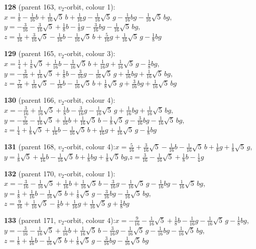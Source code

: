 \documentclass[10pt]{article}
\begin{document}
{\noindent\textbf{128} (parent 163, $v_2$-orbit, colour 1):\quad $x=\tfrac{1}{8}-\tfrac{1}{16}b+\tfrac{1}{16}\sqrt5\,b+\tfrac{1}{16}g-\tfrac{1}{16}\sqrt5\,g-\tfrac{1}{16}bg-\tfrac{1}{16}\sqrt5\,bg$,\quad $y=-\tfrac{3}{16}-\tfrac{3}{16}\sqrt5+\tfrac{1}{8}b-\tfrac{1}{8}g-\tfrac{3}{16}bg-\tfrac{1}{16}\sqrt5\,bg$,\quad $z=\tfrac{1}{16}+\tfrac{3}{16}\sqrt5-\tfrac{1}{16}b-\tfrac{1}{16}\sqrt5\,b+\tfrac{5}{16}g+\tfrac{1}{16}\sqrt5\,g-\tfrac{1}{8}bg$\par\smallskip
\noindent\textbf{129} (parent 165, $v_2$-orbit, colour 3):\quad $x=\tfrac{1}{4}+\tfrac{1}{8}\sqrt5+\tfrac{1}{16}b-\tfrac{1}{16}\sqrt5\,b+\tfrac{1}{16}g+\tfrac{1}{16}\sqrt5\,g-\tfrac{1}{8}bg$,\quad $y=-\tfrac{3}{16}+\tfrac{1}{16}\sqrt5+\tfrac{1}{8}b-\tfrac{3}{16}g-\tfrac{1}{16}\sqrt5\,g+\tfrac{1}{16}bg+\tfrac{1}{16}\sqrt5\,bg$,\quad $z=\tfrac{7}{16}+\tfrac{1}{16}\sqrt5-\tfrac{1}{16}b-\tfrac{1}{16}\sqrt5\,b+\tfrac{1}{8}\sqrt5\,g+\tfrac{3}{16}bg+\tfrac{1}{16}\sqrt5\,bg$\par\smallskip
\noindent\textbf{130} (parent 166, $v_2$-orbit, colour 4):\quad $x=-\tfrac{3}{16}+\tfrac{1}{16}\sqrt5+\tfrac{1}{8}b-\tfrac{3}{16}g-\tfrac{1}{16}\sqrt5\,g+\tfrac{1}{16}bg+\tfrac{1}{16}\sqrt5\,bg$,\quad $y=-\tfrac{7}{16}-\tfrac{1}{16}\sqrt5+\tfrac{1}{16}b+\tfrac{1}{16}\sqrt5\,b-\tfrac{1}{8}\sqrt5\,g-\tfrac{3}{16}bg-\tfrac{1}{16}\sqrt5\,bg$,\quad $z=\tfrac{1}{4}+\tfrac{1}{8}\sqrt5+\tfrac{1}{16}b-\tfrac{1}{16}\sqrt5\,b+\tfrac{1}{16}g+\tfrac{1}{16}\sqrt5\,g-\tfrac{1}{8}bg$\par\smallskip
\noindent\textbf{131} (parent 168, $v_2$-orbit, colour 4):\quad $x=\tfrac{5}{16}+\tfrac{3}{16}\sqrt5-\tfrac{1}{16}b-\tfrac{1}{16}\sqrt5\,b+\tfrac{1}{8}g+\tfrac{1}{8}\sqrt5\,g$,\quad $y=\tfrac{1}{8}\sqrt5+\tfrac{1}{16}b-\tfrac{1}{16}\sqrt5\,b+\tfrac{1}{8}bg+\tfrac{1}{8}\sqrt5\,bg$,\quad $z=\tfrac{3}{16}-\tfrac{1}{16}\sqrt5+\tfrac{1}{8}b-\tfrac{1}{4}g$\par\smallskip
\noindent\textbf{132} (parent 170, $v_2$-orbit, colour 1):\quad $x=-\tfrac{3}{16}-\tfrac{1}{16}\sqrt5+\tfrac{1}{16}b+\tfrac{1}{16}\sqrt5\,b-\tfrac{3}{16}g-\tfrac{1}{16}\sqrt5\,g-\tfrac{1}{16}bg-\tfrac{1}{16}\sqrt5\,bg$,\quad $y=\tfrac{1}{8}+\tfrac{1}{16}b-\tfrac{1}{16}\sqrt5\,b+\tfrac{1}{8}\sqrt5\,g-\tfrac{3}{16}bg-\tfrac{1}{16}\sqrt5\,bg$,\quad $z=\tfrac{9}{16}+\tfrac{1}{16}\sqrt5-\tfrac{1}{8}b+\tfrac{1}{16}g+\tfrac{1}{16}\sqrt5\,g+\tfrac{1}{8}bg$\par\smallskip
\noindent\textbf{133} (parent 171, $v_2$-orbit, colour 4):\quad $x=-\tfrac{9}{16}-\tfrac{1}{16}\sqrt5+\tfrac{1}{8}b-\tfrac{1}{16}g-\tfrac{1}{16}\sqrt5\,g-\tfrac{1}{8}bg$,\quad $y=-\tfrac{3}{16}-\tfrac{1}{16}\sqrt5+\tfrac{1}{16}b+\tfrac{1}{16}\sqrt5\,b-\tfrac{3}{16}g-\tfrac{1}{16}\sqrt5\,g-\tfrac{1}{16}bg-\tfrac{1}{16}\sqrt5\,bg$,\quad $z=\tfrac{1}{8}+\tfrac{1}{16}b-\tfrac{1}{16}\sqrt5\,b+\tfrac{1}{8}\sqrt5\,g-\tfrac{3}{16}bg-\tfrac{1}{16}\sqrt5\,bg$\par\smallskip
}
\end{document}

